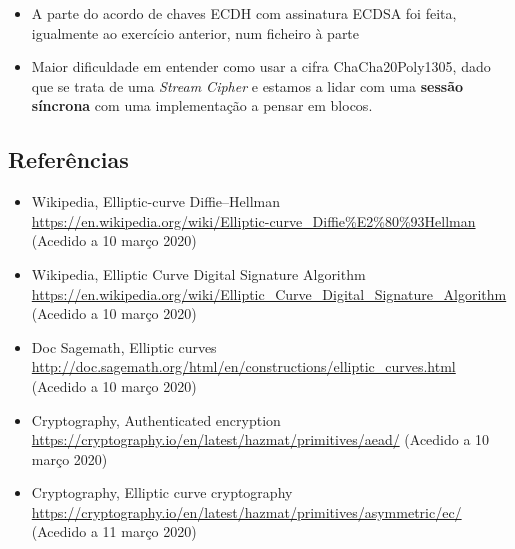 \documentclass[12pt]{report}
\providecommand{\tightlist}{%
      \setlength{\itemsep}{0pt}\setlength{\parskip}{0pt}}
\begin{document}
\begin{itemize}
\tightlist
\item
  A parte do acordo de chaves ECDH com assinatura ECDSA foi feita,
  igualmente ao exercício anterior, num ficheiro à parte
\item
  Maior dificuldade em entender como usar a cifra ChaCha20Poly1305, dado
  que se trata de uma \emph{Stream Cipher} e estamos a lidar com uma
  \textbf{sessão síncrona} com uma implementação a pensar em blocos.
\end{itemize}
\bigskip
    \hypertarget{referuxeancias}{%
\subsection{Referências}\label{referuxeancias}}

\begin{itemize}
\tightlist
\item
  Wikipedia, Elliptic-curve Diffie--Hellman
  \url{https://en.wikipedia.org/wiki/Elliptic-curve_Diffie\%E2\%80\%93Hellman}
  (Acedido a 10 março 2020)
\item
  Wikipedia, Elliptic Curve Digital Signature Algorithm
  \url{https://en.wikipedia.org/wiki/Elliptic_Curve_Digital_Signature_Algorithm}
  (Acedido a 10 março 2020)
\item
  Doc Sagemath, Elliptic curves
  \url{http://doc.sagemath.org/html/en/constructions/elliptic_curves.html}
  (Acedido a 10 março 2020)
\item
  Cryptography, Authenticated encryption
  \url{https://cryptography.io/en/latest/hazmat/primitives/aead/}
  (Acedido a 10 março 2020)
\item
  Cryptography, Elliptic curve cryptography
  \url{https://cryptography.io/en/latest/hazmat/primitives/asymmetric/ec/}
  (Acedido a 11 março 2020)
\end{itemize}

    
\end{document}
